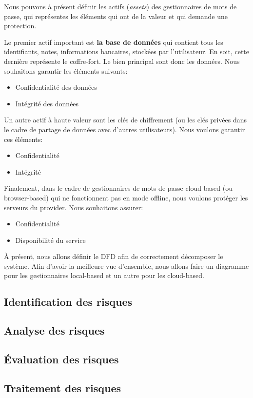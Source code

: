 Nous pouvons à présent définir les actifs (\textit{assets})  des gestionnaires de mots de passe, qui représentes les éléments qui ont de la valeur et qui demande une protection. 

Le premier actif important est \textbf{la base de données} qui contient tous les identifiants, notes, informations bancaires, stockées par l'utilisateur. En soit, cette dernière représente le coffre-fort. Le bien principal sont donc les données. Nous souhaitons garantir les éléments suivants:
\begin{itemize}
	\item Confidentialité des données
	\item Intégrité des données
\end{itemize}

Un autre actif à haute valeur sont les clés de chiffrement (ou les clés privées dans le cadre de partage de données avec d'autres utilisateurs). Nous voulons garantir ces éléments:
\begin{itemize}
	\item Confidentialité 
	\item Intégrité
\end{itemize}

Finalement, dans le cadre de gestionnaires de mots de passe cloud-based (ou browser-based) qui ne fonctionnent pas en mode offline, nous voulons protéger les serveurs du provider. Nous souhaitons assurer:
\begin{itemize}
	\item Confidentialité
	\item Disponibilité du service
\end{itemize}

À présent, nous allons définir le DFD afin de correctement décomposer le système. Afin d'avoir la meilleure vue d'ensemble, nous allons faire un diagramme pour les gestionnaires local-based et un autre pour les cloud-based.
\subsection{Identification des risques}
\subsection{Analyse des risques}
\subsection{Évaluation des risques}
\subsection{Traitement des risques}


